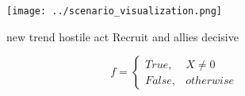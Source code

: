 \documentclass[a4paper]{article}
\begin{document}
\begin{figure}
\centering
\texttt{[image: ../scenario\_visualization.png]}
\caption{new trend hostile act Recruit and allies decisive
}
\end{figure}
 
\begin{equation}   f =
\begin{cases} True, & X \neq 0\\
False, & otherwise
\end{cases}
\end{equation}
\end{document}

